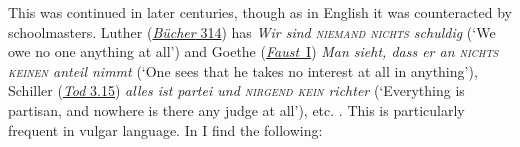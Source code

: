 This was continued in later centuries, though as in English it was counteracted by schoolmasters. Luther (\href{https://books.google.co.jp/books?id=jcZTAAAAcAAJ&pg=PA314&lpg=PA314&dq=%22Wir+sind+niemand+nichts+schuldig%22+luther&source=bl&ots=8BpFlEDTnL&sig=ACfU3U2OKDJrrof3mO6B1CveMSSGBNvuKA&hl=en&sa=X&ved=2ahUKEwjF55f1kp6HAxXrhq8BHToTCg4Q6AF6BAgNEAM#v=onepage&q=%22Wir%20sind%20niemand%20nichts%20schuldig%22%20luther%20&f=false}{\textit{Bücher} 314}) has \textit{Wir sind \textsc{niemand nichts} schuldig} (`We owe no one anything at all') and Goethe (\href{https://archive.org/details/goethesfaust00goetuoft/page/234/mode/2up?q=%22dass+er+an+nichts+keinen+anteil+nimmt%22&view=theater}{\textit{Faust}~I}) \textit{Man sieht, dass er an \textsc{nichts keinen} anteil nimmt} (`One sees that he takes no interest at all in anything'), Schiller (\href{https://archive.org/details/schillerswallen07schigoog/page/226/mode/2up?q=\%22nirgend\%22&view=theater}{\textit{Tod} 3.15}) \textit{alles ist partei und \textsc{nirgend kein} richter} (`Everything is partisan, and nowhere is there any judge at all'), etc. \citep[\href{https://archive.org/details/sprachgebrauchu00andrgoog/page/n229/mode/2up?view=theater&q=\%22keinen+anteil+nimmt\%22}{209}]{andresen1892sprachgebrauch}. This is particularly frequent in vulgar language. In \citet[\href{https://archive.org/details/unseremutterspr03weisgoog/page/n88/mode/2up?view=theater}{78}]{weise1896unsere} I find the following:


